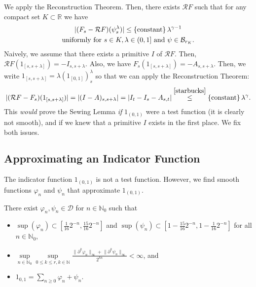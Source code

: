 We apply the Reconstruction Theorem. Then, there exists \( \mathcal{R}F \) such that for any compact set \( K \subset \mathbb{R}\) we have 
\begin{gather}
  |(F_s - \mathcal{R}F)(\psi^\lambda_s)| \leq \left\{ \mathrm{constant} \right\} \lambda^{\gamma - 1} \label{starbucks}\\
  \text{uniformly for \( s \in K, \lambda \in (0,1] \) and \( \psi \in \mathcal{B}_{r_K} \)}.\nonumber
\end{gather}
Naively, we assume that there exists a primitive \( I \) of \( \mathcal{R}F \). Then, \( \mathcal{R}F(1_{[s,s + \lambda]}) = -I_{s, s + \lambda} \). Also, we have \( F_s(1_{[s,s + \lambda]}) = -A_{s, s + \lambda} \). Then, we write \( 1_{[s, s + \lambda]}= \lambda (1_{[0,1]})^\lambda_s \) so that we can apply the Reconstruction Theorem:
\begin{align*}
  |(\mathcal{R}F  - F_s)(1_{[s,s + \lambda]})| = |(I - A)_{s, s + \lambda}| = |I_t - I_s - A_{s,t}| \overset{\eqref{starbucks}}{\leq} \left\{ \mathrm{constant} \right\} \lambda^{\gamma}.
\end{align*}
This \emph{would} prove the Sewing Lemma \emph{if} \( 1_{(0,1)} \) were a test function (it is clearly not smooth), and if we knew that a primitive \( I \) exists in the first place. We fix both issues.

\subsection*{Approximating an Indicator Function}

The indicator function \( 1_{(0,1)} \) is not a test function. However, we find smooth functions \( \varphi_n \) and \( \psi_n \) that approximate \( 1_{(0,1)} \).

\begin{lemma}
  There exist \( \varphi_n, \psi_n \in \mathcal{D} \) for \( n \in \mathbb{N}_0 \) such that 
  \begin{itemize}
    \item \( \mathrm{\sup}(\varphi_n) \subset [\frac{1}{16}2^{-n}, \frac{15}{16}2^{-n}] \) and \( \mathrm{\sup}(\psi_n) \subset [1 - \frac{15}{16}2^{-n}, 1- \frac{1}{16}2^{-n}] \) for all \( n \in \mathbb{N}_0 \),
    \item \( \sup\limits_{n \in \mathbb{N}_0} \sup\limits_{0 \leq k \leq r, k \in \mathbb{N}} \frac{\lVert \partial^k \varphi_n \rVert_{\infty} + \lVert \partial^k \psi_n \rVert_{\infty}}{2^{kn}} < \infty\), and 
    \item \( 1_{0,1} = \sum\limits_{n \geq 0} \varphi_n + \psi_n \).
  \end{itemize}
\end{lemma}

